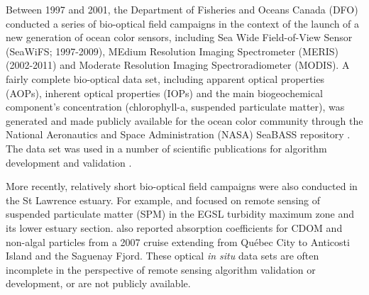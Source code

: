 \documentclass[essd, manuscript]{copernicus}
\begin{document}
Between 1997 and 2001, the Department of Fisheries and Oceans Canada (DFO) conducted a series of bio-optical field campaigns in the context of the launch of a new generation of ocean color sensors, including Sea Wide Field-of-View Sensor (SeaWiFS; 1997-2009), MEdium Resolution Imaging Spectrometer (MERIS) (2002-2011) and Moderate Resolution Imaging Spectroradiometer (MODIS). A fairly complete bio-optical data set, including apparent optical properties (AOPs), inherent optical properties (IOPs) and the main biogeochemical component's concentration (chlorophyll-a, suspended particulate matter), was generated and made publicly available for the ocean color community through the National Aeronautics and Space Administration (NASA) SeaBASS repository \citep{werdell2002seawifs}. The data set was used in a number of scientific publications for algorithm development and validation \citep[e.g.,][]{LeFouest2006, Yayla2009, Cizmeli2008, Larouche2010, MontesHugo2012, MontesHugo2015}. 

More recently, relatively short bio-optical field campaigns were also conducted in the St Lawrence estuary. For example, \citet{Mohammadpour2015} and \citet{Mohammadpour2017}  focused on remote sensing of suspended particulate matter (SPM) in the EGSL turbidity maximum zone and its lower estuary section. \citet{Xie2012} also reported absorption coefficients for CDOM and non-algal particles from a 2007 cruise extending from Québec City to Anticosti Island and the Saguenay Fjord. These optical \textit{in situ} data sets are often incomplete in the perspective of remote sensing algorithm validation or development, or are not publicly available. 
 
\end{document}
